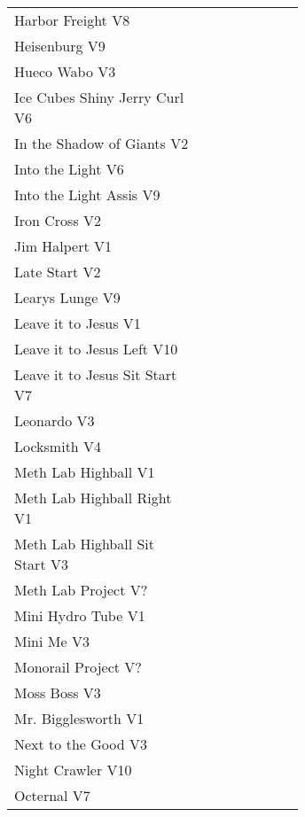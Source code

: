 \begin{flushleft}
\begin{center}
\begin{supertabular}{p{0.65\linewidth}r}
Harbor Freight V8 & \pageref{vr:Harbor Freight} \\
Heisenburg V9 & \pageref{rt:Heisenburg} \\
Hueco Wabo V3 & \pageref{rt:Hueco Wabo} \\
Ice Cubes Shiny Jerry Curl V6 & \pageref{rt:Ice Cubes Shiny Jerry Curl} \\
In the Shadow of Giants V2 & \pageref{rt:In the Shadow of Giants} \\
Into the Light V6 & \pageref{rt:Into the Light} \\
Into the Light Assis V9 & \pageref{vr:Into the Light Assis} \\
Iron Cross V2 & \pageref{vr:Iron Cross} \\
Jim Halpert V1 & \pageref{rt:Jim Halpert} \\
Late Start V2 & \pageref{vr:Late Start} \\
Learys Lunge V9 & \pageref{vr:Learys Lunge} \\
Leave it to Jesus V1 & \pageref{rt:Leave it to Jesus} \\
Leave it to Jesus Left V10 & \pageref{vr:Leave it to Jesus Left} \\
Leave it to Jesus Sit Start V7 & \pageref{vr:Leave it to Jesus Sit Start} \\
Leonardo V3 & \pageref{rt:Leonardo} \\
Locksmith V4 & \pageref{rt:Locksmith} \\
Meth Lab Highball V1 & \pageref{rt:Meth Lab Highball} \\
Meth Lab Highball Right V1 & \pageref{rt:Meth Lab Highball Right} \\
Meth Lab Highball Sit Start V3 & \pageref{vr:Meth Lab Highball Sit Start} \\
Meth Lab Project V? & \pageref{rt:Meth Lab Project} \\
Mini Hydro Tube V1 & \pageref{rt:Mini Hydro Tube} \\
Mini Me V3 & \pageref{rt:Mini Me} \\
Monorail Project V? & \pageref{rt:Monorail Project} \\
Moss Boss V3 & \pageref{rt:Moss Boss} \\
Mr. Bigglesworth V1 & \pageref{vr:Mr. Bigglesworth} \\
Next to the Good V3 & \pageref{rt:Next to the Good} \\
Night Crawler V10 & \pageref{rt:Night Crawler} \\
Octernal V7 & \pageref{rt:Octernal} \\

\end{supertabular}
\end{center}
\end{flushleft}
